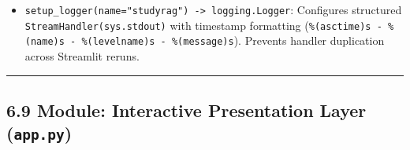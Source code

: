 \documentclass[
]{article}
\providecommand{\tightlist}{%
  \setlength{\itemsep}{0pt}\setlength{\parskip}{0pt}}
\begin{document}
\begin{itemize}
\tightlist
\item
  \texttt{setup\_\allowbreak logger(\allowbreak name=\allowbreak "studyrag")\allowbreak \ \allowbreak -\textgreater{}\allowbreak \ \allowbreak logging.\allowbreak Logger}:
  Configures structured \texttt{StreamHandler(\allowbreak sys.\allowbreak stdout)\allowbreak } with
  timestamp formatting
  (\texttt{\%(\allowbreak asctime)\allowbreak s\ \allowbreak -\ \allowbreak \%(\allowbreak name)\allowbreak s\ \allowbreak -\ \allowbreak \%(\allowbreak levelname)\allowbreak s\ \allowbreak -\ \allowbreak \%(\allowbreak message)\allowbreak s}).
  Prevents handler duplication across Streamlit reruns.
\end{itemize}

\begin{center}\rule{0.5\linewidth}{0.5pt}\end{center}

\subsection{\texorpdfstring{6.9 Module: Interactive Presentation Layer
(\texttt{app.\allowbreak py})}{6.9 Module: Interactive Presentation Layer (app.py)}}\label{module-interactive-presentation-layer-app.py}
\end{document}
